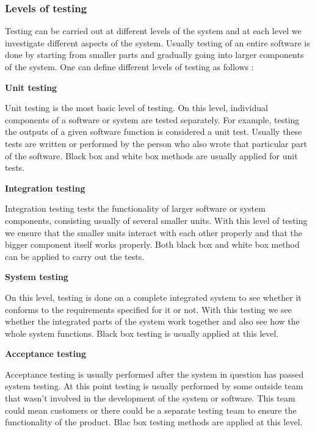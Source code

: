 \documentclass[english,12pt,a4paper,pdftex,elec,utf8]{aaltothesis}
\begin{document}
\subsubsection{Levels of testing}
Testing can be carried out at different levels of the system and at each level we investigate different aspects of the system. Usually testing of an entire software is done by starting from smaller parts and gradually going into larger components of the system. \cite{sularikurssi, testingcomplex}
One can define different levels of testing as follows \cite{sularikurssi, testingcomplex}:\par 
\textbf{Unit testing}\par 
Unit testing is the most basic level of testing. On this level, individual components of a software or system are tested separately. For example, testing the outputs of a given software function is considered a unit test. Usually these tests are written or performed by the person who also wrote that particular part of the software. Black box and white box methods are usually applied for unit tests. \cite{sularikurssi}\par
\textbf{Integration testing}\par 
Integration testing tests the functionality of larger software or system components, consisting usually of several smaller units. With this level of testing we ensure that the smaller units interact with each other properly and that the bigger component itself works properly. Both black box and white box method can be applied to carry out the tests. \cite{sularikurssi}\par
\textbf{System testing}\par 
On this level, testing is done on a complete integrated system to see whether it conforms to the requirements specified for it or not. With this testing we see whether the integrated parts of the system work together and also see how the whole system functions. Black box testing is usually applied at this level. \cite{sularikurssi}\par
\textbf{Acceptance testing}\par 
Acceptance testing is usually performed after the system in question has passed system testing. At this point testing is usually performed by some outside team that wasn't involved in the development of the system or software. This team could mean customers or there could be a separate testing team to ensure the functionality of the product. Blac box testing methods are applied at this level.\par
\end{document}
